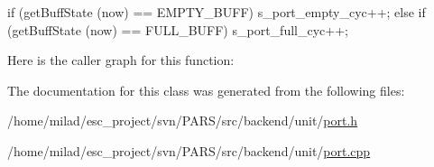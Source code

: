 \begin{DoxyCode}
                                        {
    if (getBuffState (now) == EMPTY_BUFF) {
        s_port_empty_cyc++;
    } else if (getBuffState (now) == FULL_BUFF) {
        s_port_full_cyc++;
    }
}
\end{DoxyCode}


Here is the caller graph for this function:




The documentation for this class was generated from the following files:\begin{DoxyCompactItemize}
\item 
/home/milad/esc\_\-project/svn/PARS/src/backend/unit/\hyperlink{unit_2port_8h}{port.h}\item 
/home/milad/esc\_\-project/svn/PARS/src/backend/unit/\hyperlink{unit_2port_8cpp}{port.cpp}\end{DoxyCompactItemize}
